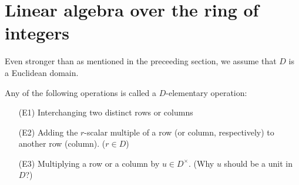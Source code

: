 \section{Linear algebra over the ring of integers}

Even stronger than as mentioned in the preceeding section, we assume that $D$ is a Euclidean domain.

\begin{defi}
    Any of the following operations is called a $D$-elementary operation:
    \begin{enumerate}
        \item[(E1)]
        {
            Interchanging two distinct rows or columns
        }
        \item[(E2)]
        {
            Adding the $r$-scalar multiple of a row (or column, respectively) to another row (column). ($r\in D$)
        }
        \item[(E3)]
        {
            Multiplying a row or a column by $u\in D^\times$. \color{brown}(Why $u$ should be a unit in $D$?)\color{black}
        }
    \end{enumerate}
\end{defi}

